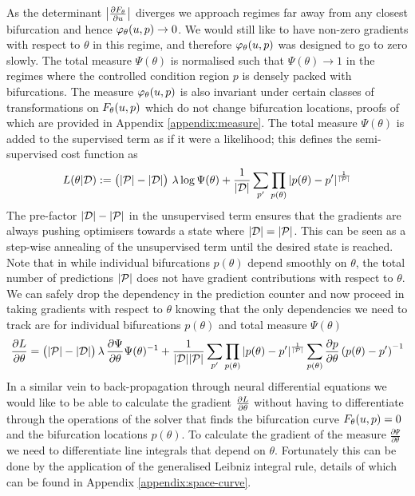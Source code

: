 As the determinant $\left| \frac{\partial F_{\theta}}{\partial u} \right|$ diverges we approach regimes far away from any closest bifurcation and hence $\varphi_{\theta}(u,p)\rightarrow0$. We would still like to have non-zero gradients with respect to $\theta$ in this regime, and therefore $\varphi_{\theta}(u,p)$ was designed to go to zero slowly. The total measure $\Psi(\theta)$ is normalised such that $\Psi(\theta)\rightarrow1$ in the regimes where the controlled condition region $p$ is densely packed with bifurcations. The measure $\varphi_{\theta}(u,p)$ is also invariant under certain classes of transformations on $F_{\theta}(u,p)$ which do not change bifurcation locations, proofs of which are provided in Appendix \ref{appendix:measure}. The total measure $\Psi(\theta)$ is added to the supervised term as if it were a likelihood; this defines the semi-supervised cost function as
\begin{align}
    L(\theta|\mathcal{D}):=
    \big(|\mathcal{P}|-|\mathcal{D}|\big)\,\,\lambda \log\Psi(\theta)+
    \frac{1}{|\mathcal{D}|}\sum_{p'}
    \prod_{p(\theta)}|p(\theta)-p'|
    ^{\frac{1}{|\mathcal{P}|}}
    \label{eq:loss}
\end{align}
The pre-factor $|\mathcal{D}|-|\mathcal{P}|$ in the unsupervised term ensures that the gradients are always pushing optimisers towards a state where $|\mathcal{D}|=|\mathcal{P}|$. This can be seen as a step-wise annealing of the unsupervised term until the desired state is reached. Note that in while individual bifurcations $p(\theta)$ depend smoothly on $\theta$, the total number of predictions $|\mathcal{P}|$ does not have gradient contributions with respect to $\theta$. We can safely drop the dependency in the prediction counter and now proceed in taking gradients with respect to $\theta$ knowing that the only dependencies we need to track are for individual bifurcations $p(\theta)$ and total measure $\Psi(\theta)$
\begin{align}
    \frac{\partial L}{\partial\theta}=
    \big(|\mathcal{P}|-|\mathcal{D}|\big)\,\lambda\,
    \frac{\partial \Psi}{\partial\theta}\Psi(\theta)^{-1}+
    \frac{1}{|\mathcal{D}||\mathcal{P}|}\sum_{p'}
    \prod_{p(\theta)}|p(\theta)-p'|^{\frac{1}{|\mathcal{P}|}}
    \sum_{p(\theta)}\frac{\partial p}{\partial\theta}\left(p(\theta)-p'\right)^{-1}
    \label{eq:gradient-loss}
\end{align}
In a similar vein to back-propagation through neural differential equations \cite{Chen2018NeuralEquations} we would like to be able to calculate the gradient $\frac{\partial L}{\partial\theta}$ without having to differentiate through the operations of the solver that finds the bifurcation curve $F_{\theta}(u,p)=0$ and the bifurcation locations $p(\theta)$. To calculate the gradient of the measure $\frac{\partial \Psi}{\partial\theta}$ we need to differentiate line integrals that depend on $\theta$. Fortunately this can be done by the application of the generalised Leibniz integral rule, details of which can be found in Appendix \ref{appendix:space-curve}.

